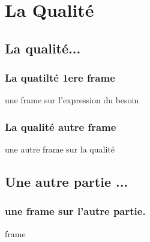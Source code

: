 \section{La Qualité}
\subsection{La qualité...}
\begin{frame}
  \frametitle{\color{white} La quatilté 1ere frame}
  une frame sur l'expression du besoin
\end{frame}
\begin{frame}
  \frametitle{\color{white} La qualité autre frame}
  une autre frame sur la qualité
\end{frame}
\subsection{Une autre partie ...}
\begin{frame}
  \frametitle{\color{white} une frame sur l'autre partie.}
  frame
\end{frame}
